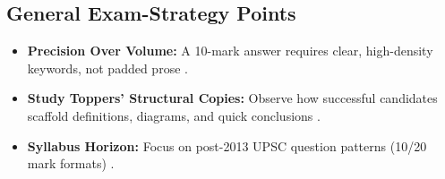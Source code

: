 \subsection{General Exam-Strategy Points}
\begin{itemize}
    \item \textbf{Precision Over Volume:} A 10-mark answer requires clear, high-density keywords, not padded prose .
    \item \textbf{Study Toppers' Structural Copies:} Observe how successful candidates scaffold definitions, diagrams, and quick conclusions .
    \item \textbf{Syllabus Horizon:} Focus on post-2013 UPSC question patterns (10/20 mark formats) .
\end{itemize}